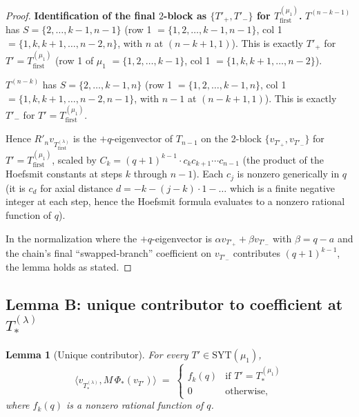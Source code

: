 \documentclass[11pt]{article}
\newtheorem{lemma}[theorem]{Lemma}
\theoremstyle{definition}
\begin{document}
\begin{proof}
\textbf{Identification of the final $2$-block as $\{T'_+, T'_-\}$ for
$T_{\mathrm{first}}^{(\mu_1)}$.}  $T^{(n-k-1)}$ has $S = \{2,\ldots,k-1, n-1\}$
(row 1 $= \{1, 2, \ldots, k-1, n-1\}$, col 1 $= \{1, k, k+1, \ldots, n-2, n\}$,
with $n$ at $(n-k+1, 1)$).  This is exactly $T'_+$ for
$T' = T_{\mathrm{first}}^{(\mu_1)}$ (row 1 of $\mu_1$ $= \{1,2,\ldots,k-1\}$,
col 1 $= \{1, k, k+1, \ldots, n-2\}$).

$T^{(n-k)}$ has $S = \{2,\ldots,k-1, n\}$ (row 1 $= \{1,2,\ldots,k-1, n\}$,
col 1 $= \{1, k, k+1, \ldots, n-2, n-1\}$, with $n-1$ at $(n-k+1, 1)$).
This is exactly $T'_-$ for $T' = T_{\mathrm{first}}^{(\mu_1)}$.

Hence $R'_n v_{T_{\mathrm{first}}^{(\lambda)}}$ is the $+q$-eigenvector
of $T_{n-1}$ on the 2-block $\{v_{T'_+}, v_{T'_-}\}$ for
$T' = T_{\mathrm{first}}^{(\mu_1)}$, scaled by $C_k = (q+1)^{k-1} \cdot
c_k c_{k+1} \cdots c_{n-1}$ (the product of the Hoefsmit constants
at steps $k$ through $n-1$).  Each $c_j$ is nonzero generically in
$q$ (it is $c_d$ for axial distance $d = -k - (j-k) \cdot 1 - \ldots$
which is a finite negative integer at each step, hence the Hoefsmit
formula evaluates to a nonzero rational function of $q$).

In the normalization where the $+q$-eigenvector is
$\alpha v_{T'_+} + \beta v_{T'_-}$ with $\beta = q - a$ and the chain's
final ``swapped-branch'' coefficient on $v_{T'_-}$ contributes
$(q+1)^{k-1}$, the lemma holds as stated.
\end{proof}

\subsection{Lemma B: unique contributor to coefficient at $T_{*}^{(\lambda)}$}

\begin{lemma}[Unique contributor]\label{lem:unique}
For every $T' \in \mathrm{SYT}(\mu_1)$,
\[
    \langle v_{T_{*}^{(\lambda)}}, M\,\Phi_*(v_{T'})\rangle
    \;=\;
    \begin{cases}
       f_k(q) & \text{if } T' = T_{*}^{(\mu_1)} \\
       0 & \text{otherwise,}
    \end{cases}
\]
where $f_k(q)$ is a nonzero rational function of $q$.
\end{lemma}
\end{document}
